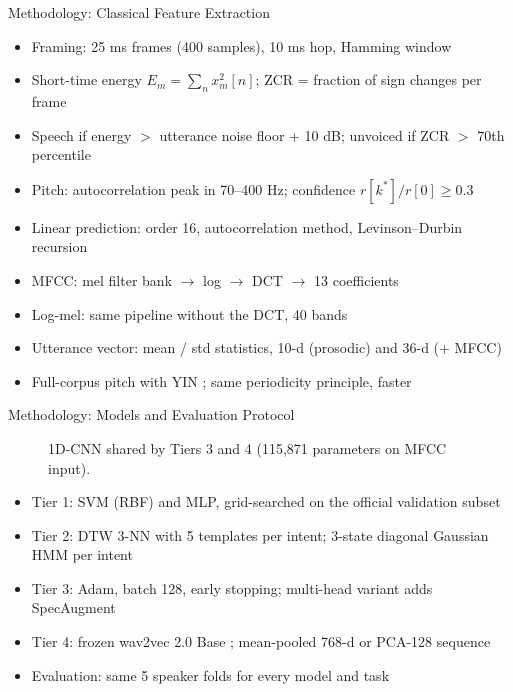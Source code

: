 \documentclass[aspectratio=169,10pt,xcolor=table]{beamer}
\begin{document}
\begin{frame}{Methodology: Classical Feature Extraction}
\begin{itemize}\setlength{\itemsep}{5pt}
\item Framing: 25 ms frames (400 samples), 10 ms hop, Hamming window
\item Short-time energy $E_m = \sum_n x_m^2[n]$; ZCR = fraction of sign changes per frame
\item Speech if energy $>$ utterance noise floor + 10 dB; unvoiced if ZCR $>$ 70th percentile
\item Pitch: autocorrelation peak in 70--400 Hz; confidence $r[k^\ast]/r[0] \ge 0.3$
\item Linear prediction: order 16, autocorrelation method, Levinson--Durbin recursion
\item MFCC: mel filter bank $\rightarrow$ log $\rightarrow$ DCT $\rightarrow$ 13 coefficients
\item Log-mel: same pipeline without the DCT, 40 bands
\item Utterance vector: mean / std statistics, 10-d (prosodic) and 36-d (+ MFCC)
\item Full-corpus pitch with YIN \cite{decheveigne2002yin}; same periodicity principle, faster
\end{itemize}
\end{frame}

\begin{frame}{Methodology: Models and Evaluation Protocol}
\begin{figure}
\centering
\resizebox{0.94\linewidth}{!}{}
\vspace{-4pt}
\caption{1D-CNN shared by Tiers 3 and 4 (115,871 parameters on MFCC input).}
\end{figure}
\vspace{-6pt}
\small
\begin{itemize}\setlength{\itemsep}{1pt}
\item Tier 1: SVM (RBF) and MLP, grid-searched on the official validation subset
\item Tier 2: DTW 3-NN with 5 templates per intent; 3-state diagonal Gaussian HMM per intent
\item Tier 3: Adam, batch 128, early stopping; multi-head variant adds SpecAugment \cite{park2019specaugment}
\item Tier 4: frozen wav2vec 2.0 Base \cite{baevski2020wav2vec2}; mean-pooled 768-d or PCA-128 sequence
\item Evaluation: same 5 speaker folds for every model and task
\end{itemize}
\end{frame}
\end{document}
